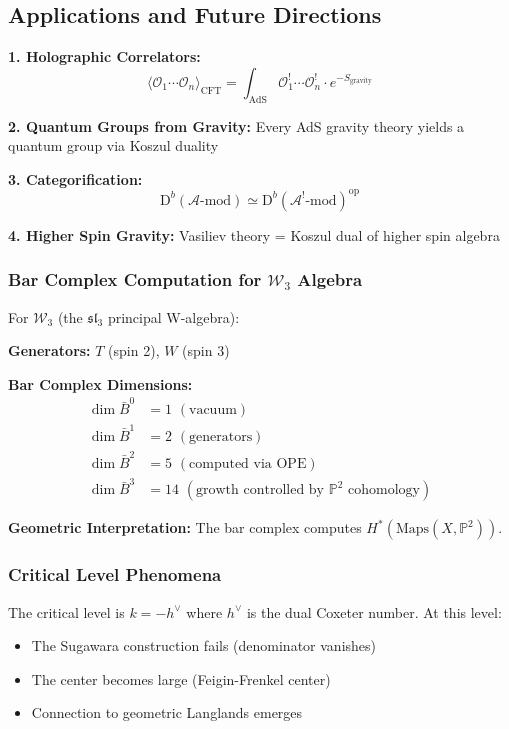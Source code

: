 \subsection{Applications and Future Directions}

\begin{applications}
\textbf{1. Holographic Correlators:}
$$\langle \mathcal{O}_1 \cdots \mathcal{O}_n \rangle_{\text{CFT}} = \int_{\text{AdS}} \mathcal{O}_1^! \cdots \mathcal{O}_n^! \cdot e^{-S_{\text{gravity}}}$$

\textbf{2. Quantum Groups from Gravity:}
Every AdS gravity theory yields a quantum group via Koszul duality

\textbf{3. Categorification:}
$$\text{D}^b(\mathcal{A}\text{-mod}) \simeq \text{D}^b(\mathcal{A}^!\text{-mod})^{\text{op}}$$

\textbf{4. Higher Spin Gravity:}
Vasiliev theory = Koszul dual of higher spin algebra
\end{applications}

\subsubsection{Bar Complex Computation for $\mathcal{W}_3$ Algebra}

\begin{example}\label{ex:w3-bar}
For $\mathcal{W}_3$ (the $\mathfrak{sl}_3$ principal W-algebra):

\textbf{Generators:} $T$ (spin 2), $W$ (spin 3)

\textbf{Bar Complex Dimensions:}
\begin{align}
\dim \bar{B}^0 &= 1 \,\, (\text{vacuum}) \\
\dim \bar{B}^1 &= 2 \,\, (\text{generators}) \\
\dim \bar{B}^2 &= 5 \,\, (\text{computed via OPE}) \\
\dim \bar{B}^3 &= 14 \,\, (\text{growth controlled by } \mathbb{P}^2 \text{ cohomology})
\end{align}

\textbf{Geometric Interpretation:} The bar complex computes $H^*(\mathrm{Maps}(X, \mathbb{P}^2))$.
\end{example}

\subsubsection{Critical Level Phenomena}

\begin{definition}\label{def:critical}
The critical level is $k = -h^\vee$ where $h^\vee$ is the dual Coxeter number. At this level:
\begin{itemize}
\item The Sugawara construction fails (denominator vanishes)
\item The center becomes large (Feigin-Frenkel center)
\item Connection to geometric Langlands emerges
\end{itemize}
\end{definition}

